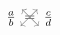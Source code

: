 \documentclass[10pt,a4paper]{article}
\newcommand{\pcrux}{\quad %
		\makebox[0pt][c]{=}{ %
			\color{gray} %
			\makebox[0pt][c]{ %
				\rotatebox[origin=c]{45}{$\longleftrightarrow$} %
			} %
			\makebox[0pt][c]{ %
				\rotatebox[origin=c]{-45}{$\longleftrightarrow$} %
			} %
		} %
		\quad%
	}
\begin{document}
$\frac {a}{b}  \pcrux \frac{c}{d}$
\end{document}
